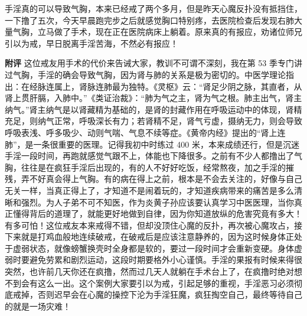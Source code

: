 \begin{case}
    手淫真的可以导致气胸，本来已经戒了两个多月，但是昨天心魔反扑没有抵挡住，一下撸了五次，今天早晨跑完步之后就感觉胸口特别疼，去医院检查后发现右肺大量气胸，立马做了手术，现在正在医院病床上躺着。原来真的有报应，劝诸位师兄引以为戒，早日脱离手淫苦海，不然必有报应！

    \textbf{附评} 这位戒友用手术的代价来告诫大家，教训不可谓不深刻，我在第 53 季专门讲过气胸，手淫的确会导致气胸，因为肾与肺的关系是极为密切的。中医学理论指出：在经脉连属上，肾脉连肺最为独特。《灵枢》云：“肾足少阴之脉，其直者，从肾上贯肝膈，入肺中。”《类证治裁》：“肺为气之主，肾为气之根。肺主出气，肾主纳气。”肾主纳气是以肾藏精为基础的，是肾的封藏作用在呼吸运动中的体现，肾精充足，则纳气正常，呼吸深长有力；若肾精不足，肾气亏虚，摄纳无力，则会导致呼吸表浅、呼多吸少、动则气喘、气息不续等症。《黄帝内经》提出的“肾上连肺”，是一条很重要的医理。记得我初中时练过 400 米，本来成绩还行，但是沉迷手淫一段时间，再跑就感觉气跟不上，体能也下降很多。之前有不少人都撸出了气胸，往往是在疯狂手淫后出现的，有的人不好好吃饭，经常熬夜，加之手淫的摧残，弄不好真会得上气胸。有的病在得上之前，根本是不会去关注的，好像与自己无关一样，当真正得上了，才知道不是闹着玩的，才知道疾病带来的痛苦是多么清晰和强烈。为人子弟不可不知医，作为炎黄子孙应该要认真学习中医医理，当你真正懂得背后的道理了，就能更好地做到自律，因为你知道放纵的危害究竟有多大！有多可怕！这位戒友本来戒得不错，但却没顶住心魔的反扑，再次被心魔攻占，接下来就是打鸡血般地连续破戒，在破戒后是应该注意静养的，因为这时候身体正处于虚弱状态，就像螃蟹换壳时全身都是软的，要过一段时间才会重新变硬。身体虚弱时要避免劳累和剧烈运动，这段时期要格外小心谨慎。手淫的果报有时候来得很突然，也许前几天你还在疯撸，然而过几天人就躺在手术台上了，在疯撸时绝对想不到会有这么一出。这个案例大家要引以为戒，引起足够的重视，手淫恶习必须彻底戒掉，否则迟早会在心魔的操控下沦为手淫狂魔，疯狂掏空自己，最终等待自己的就是一场灾难！
\end{case}

